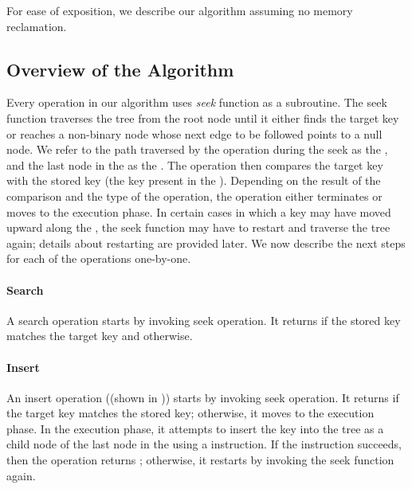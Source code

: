 \begin{limitscope}
For ease of exposition, we describe our algorithm assuming no memory reclamation.

\subsection{Overview of the Algorithm}

Every operation in our algorithm uses \emph{seek} function as a subroutine. The seek function traverses the  tree from the root node until it either finds the target key or reaches a non-binary node whose next edge to be followed points to a null node. We refer to the path traversed by the operation during the seek  as the \emph{\accesspath}, and the last node in the \accesspath{} as the \emph{\terminalnode}. The operation then compares the target key with the stored key (the key present in the \terminalnode). Depending on the result of the comparison and the type of the operation, the operation either terminates or moves to the execution phase. In certain cases in which a key may have moved upward along the \accesspath, the seek function may have to restart and traverse the tree again; details about restarting are provided later. We now describe the next steps for each of the operations one-by-one.

\paragraph*{Search} 
A search operation starts by invoking seek operation. It returns \true{} if the stored key matches the target key and \false{} otherwise. 

\paragraph*{Insert}
An insert operation ((shown in )) starts by invoking seek operation. It returns \false{} if the target key matches the stored key; otherwise, it moves to the execution phase. In the execution phase, it attempts to insert the key into the tree as a child node of the last node in the \accesspath{} using a \CAS{} instruction. If the instruction succeeds, then the operation returns \true{}; otherwise, it restarts by invoking the seek function again.


\end{limitscope}
